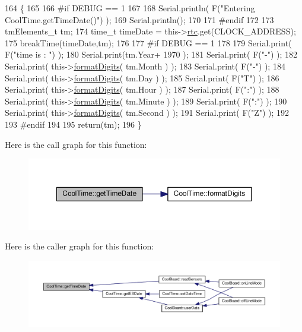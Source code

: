 \begin{DoxyCode}
164 \{
165 
166 \textcolor{preprocessor}{#if DEBUG == 1 }
167     
168     Serial.println( F(\textcolor{stringliteral}{"Entering CoolTime.getTimeDate()"}) );
169     Serial.println();
170 
171 \textcolor{preprocessor}{#endif}
172 
173     tmElements\_t tm;
174     time\_t timeDate = this->\hyperlink{class_cool_time_abd38f2384ff90692b1568d9db869412e}{rtc}.get(CLOCK\_ADDRESS);
175     breakTime(timeDate,tm);
176 
177 \textcolor{preprocessor}{#if DEBUG == 1}
178     
179     Serial.print( F(\textcolor{stringliteral}{"time is : "}) );
180     Serial.print(tm.Year+ 1970 );
181     Serial.print( F(\textcolor{stringliteral}{"-"}) );
182     Serial.print( this->\hyperlink{class_cool_time_acd537cd4210d7bde4e1f5c47d2ac0456}{formatDigits}( tm.Month ) );
183     Serial.print( F(\textcolor{stringliteral}{"-"}) );
184     Serial.print( this->\hyperlink{class_cool_time_acd537cd4210d7bde4e1f5c47d2ac0456}{formatDigits}( tm.Day ) );
185     Serial.print( F(\textcolor{stringliteral}{"T"}) );
186     Serial.print( this->\hyperlink{class_cool_time_acd537cd4210d7bde4e1f5c47d2ac0456}{formatDigits}( tm.Hour ) );
187     Serial.print( F(\textcolor{stringliteral}{":"}) );
188     Serial.print( this->\hyperlink{class_cool_time_acd537cd4210d7bde4e1f5c47d2ac0456}{formatDigits}( tm.Minute ) );
189     Serial.print( F(\textcolor{stringliteral}{":"}) );
190     Serial.print( this->\hyperlink{class_cool_time_acd537cd4210d7bde4e1f5c47d2ac0456}{formatDigits}( tm.Second ) );
191     Serial.print( F(\textcolor{stringliteral}{"Z"}) );
192 
193 \textcolor{preprocessor}{#endif}
194     
195     \textcolor{keywordflow}{return}(tm);
196 \}
\end{DoxyCode}
Here is the call graph for this function\+:\nopagebreak
\begin{figure}[H]
\begin{center}
\leavevmode
\includegraphics[width=350pt]{d6/d49/class_cool_time_a7a7501c5ca77dd1248bea704c44f986c_cgraph}
\end{center}
\end{figure}
Here is the caller graph for this function\+:\nopagebreak
\begin{figure}[H]
\begin{center}
\leavevmode
\includegraphics[width=350pt]{d6/d49/class_cool_time_a7a7501c5ca77dd1248bea704c44f986c_icgraph}
\end{center}
\end{figure}
